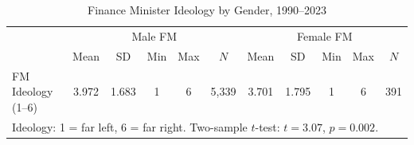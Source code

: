\begin{table}[htbp]\centering
\def\sym#1{\ifmmode^{#1}\else\(^{#1}\)\fi}
\caption{Finance Minister Ideology by Gender, 1990--2023}
\label{tab:ideology}
\begin{tabular}{l*{2}{ccccc}}
\hline\hline
            &\multicolumn{5}{c}{Male FM}&\multicolumn{5}{c}{Female FM}\\
            & Mean & SD & Min & Max & $N$ & Mean & SD & Min & Max & $N$\\
\hline
FM Ideology (1--6) & 3.972 & 1.683 & 1 & 6 & 5,339 & 3.701 & 1.795 & 1 & 6 & 391\\
\hline\hline
\multicolumn{11}{l}{\footnotesize Ideology: 1 = far left, 6 = far right. Two-sample $t$-test: $t=3.07$, $p=0.002$.}\\
\end{tabular}
\end{table}
